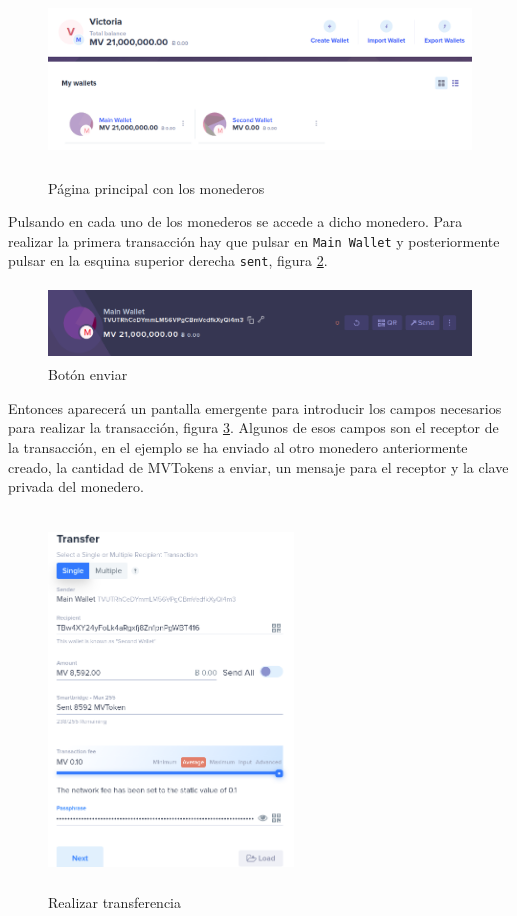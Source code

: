 \begin{figure}[H]
	\centering
	\includegraphics[width=13cm,height=5cm]{figuras/wallet_panel.png}
	\caption{Página principal con los monederos}
	\label{fig:wallet-princi}
\end{figure}

Pulsando en cada uno de los monederos se accede a dicho monedero. Para realizar la primera transacción hay que pulsar en \texttt{Main Wallet} y posteriormente pulsar en la esquina superior derecha \texttt{sent}, figura \ref{fig:transfer}.\\

\begin{figure}[H]
	\centering
	\includegraphics[width=13cm,height=2cm]{figuras/transfer.png}
	\caption{Botón enviar}
	\label{fig:transfer}
\end{figure}

Entonces aparecerá un pantalla emergente para introducir los campos necesarios para realizar la transacción, figura \ref{fig:wallet-18}. Algunos de esos campos son el receptor de la transacción, en el ejemplo se ha enviado al otro monedero anteriormente creado, la cantidad de MVTokens a enviar, un mensaje para el receptor y la clave privada del monedero.

\begin{figure}[H]
	\centering
	\includegraphics[width=6.5cm,height=10cm]{figuras/wallet_18.png}
	\caption{Realizar transferencia}
	\label{fig:wallet-18}
\end{figure}

